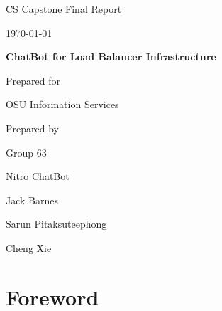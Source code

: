 \documentclass[onecolumn, draftclsnofoot,10pt, compsoc]{IEEEtran}
\def \CapstoneTeamName{		    Nitro ChatBot}
\def \CapstoneTeamNumber{		63}
\def \GroupMemberOne{			Jack Barnes}
\def \GroupMemberTwo{			Sarun Pitaksuteephong}
\def \GroupMemberThree{			Cheng Xie}
\def \CapstoneProjectName{		ChatBot for Load Balancer Infrastructure}
\def \CapstoneSponsorCompany{	OSU Information Services}
\def \DocType{	%
				Final Report
				}
\begin{document}
\begin{titlepage}
    \begin{singlespace}
        \hfill
        \par\vspace{.2in}
        \centering
        \scshape{
            \huge CS Capstone \DocType \par
            {\large\today}\par
            \vspace{.5in}
            \textbf{\Huge\CapstoneProjectName}\par
            \vfill
            {\large Prepared for}\par
            \Huge \CapstoneSponsorCompany\par
            \vspace{5pt}
            {\large Prepared by }\par
            Group\CapstoneTeamNumber\par
            \CapstoneTeamName\par 
            \vspace{5pt}
            {\Large
                \GroupMemberOne\par
                \GroupMemberTwo\par
                \GroupMemberThree\par
            }
            \vspace{20pt}
        }
        \begin{abstract}
            This document details the progress in design and development of CS63's Capstone project, Nitro Chatbot, for the school year ending June 2020.
            Nitro Chatbot is a chatbot interface that allows users to quickly access the status us, and modify basic configurations for their load balanced resources on a Citrix NetScaler.
            This report contains documentation developed by the team, the agreed-upon requirements of the project, and the state of the project as it hits version 1.0.
        \end{abstract}     
    \end{singlespace}
\end{titlepage}
\newpage
{}
\setcounter{tocdepth}{4}
\tableofcontents
\listoffigures
\listoftables
\clearpage


\section{Foreword}
\end{document}
